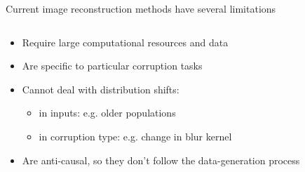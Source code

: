 \begin{frame}{Current image reconstruction methods have several limitations}


\begin{columns}
\begin{column}{0.5\textwidth}

\begin{itemize}
\item Require large computational resources and data

\vt

\item Are specific to particular corruption tasks

\vt 

\item Cannot deal with distribution shifts:
\begin{itemize}
  \item in inputs: e.g. older populations
  \item in corruption type: e.g. change in blur kernel
\end{itemize}

\vt

\item Are anti-causal, so they don't follow the data-generation process 

 
\end{itemize}

\end{column}

\begin{column}{0.5\textwidth}
 \centering
\brgmprev  
 
\end{column}
\end{columns} 


\end{frame}



